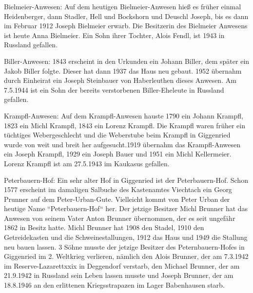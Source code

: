 \documentclass[12pt,a4pager]{book}
\begin{document}
Bielmeier-Anwesen: Auf dem heutigen Bielmeier-Anwesen hieß es früher einmal
Heidenberger, dann Stadler, Hell und Bockshorn und Deuschl Joseph, bis es dann
im Februar 1912 Joseph Bielmeier erwarb. Die Besitzerin des Bielmeier Anwesens
ist heute Anna Bielmeier. Ein Sohn ihrer Tochter, Alois Fendl, ist 1943 in
Russland gefallen.

Biller-Anwesen: 1843 erscheint in den Urkunden ein Johann Biller, dem später ein
Jakob Biller folgte. Dieser hat dann 1937 das Haus neu gebaut. 1952 übernahm
durch Einheirat ein Joseph Steinbauer von Haberleuthen dieses Anwesen. Am
7.5.1944 ist ein Sohn der bereits verstorbenen Biller-Eheleute in Russland
gefallen.

Krampfl-Anwesen: Auf dem Krampfl-Anwesen hauste 1790 ein Johann Krampfl, 1823
ein Michl Krampfl, 1843 ein Lorenz Krampfl. Die Krampfl waren früher ein
tüchtiges Webergeschlecht und die Weberstube beim Krampfl in Giggenried wurde
von weit und breit her aufgesucht.1919 übernahm das Krampfl-Anwesen ein Joseph
Krampfl, 1929 ein Joseph Bauer und 1951 ein Michl Kellermeier. Lorenz Krampfl
ist am 27.5.1943 im Kaukasus gefallen.

Peterbauern-Hof: Ein sehr alter Hof in Giggenried ist der Peterbauern-Hof. Schon
1577 erscheint im damaligen Salbuche des Kastenamtes Viechtach ein Georg Prunner
auf dem Peter-Urban-Gute. Vielleicht kommt von Peter Urban der heutige Name
“Peterbauern-Hof“ her. Der jetzige Besitzer Michl Brunner hat das Anwesen von
seinem Vater Anton Brunner übernommen, der es seit ungefähr 1862 in Besitz
hatte. Michl Brunner hat 1908 den Stadel, 1910 den Getreidekasten und die
Schweinestallungen, 1912 das Haus und 1949 die Stallung neu bauen lassen. 3
Söhne musste der jetzige Besitzer des Peternbauern-Hofes in Giggenried im 2.
Weltkrieg verlieren, nämlich den Alois Brunner, der am 7.3.1942 im
Reserve-Lazarettxxix in Deggendorf verstarb, den Michael Brunner, der am
21.9.1942 in Russland sein Leben lassen musste und Joseph Brunner, der am
18.8.1946 an den erlittenen Kriegsstrapazen im Lager Babenhausen starb.
\end{document}
